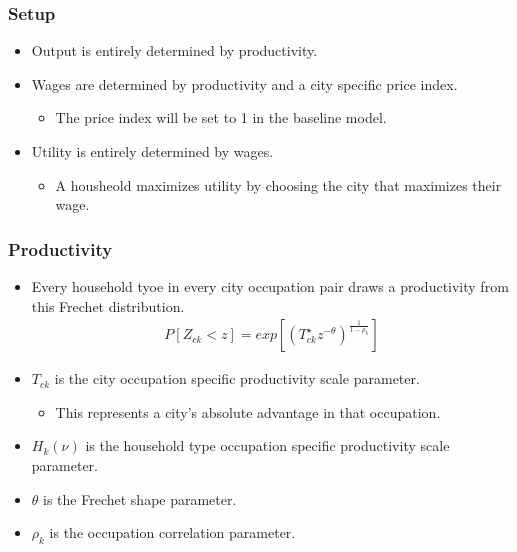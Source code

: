 \documentclass[serif, 9pt, aspectratio=32]{beamer}
\begin{document}
\begin{frame}
    \centering
    \frametitle{Setup}
    \begin{itemize}
        \setlength{\itemsep}{3em}
        \item Output is entirely determined by productivity.
        \item Wages are determined by productivity and a city specific price index.
              \begin{itemize}
                  \item The price index will be set to 1 in the baseline model.
              \end{itemize}
        \item Utility is entirely determined by wages.
              \begin{itemize}
                  \item A housheold maximizes utility by choosing the city that maximizes their wage.
              \end{itemize}
    \end{itemize}
\end{frame}

\begin{frame}
    \centering
    \frametitle{Productivity}
    \begin{itemize}
        \setlength{\itemsep}{2em}
        \item Every household tyoe in every city occupation pair draws a productivity from this Frechet distribution.
              \vspace{2em}
              \begin{equation}
                  \label{specific_Frechet}
                  \begin{aligned}
                      P[Z_{ck} < z] = exp[(T_{ck}^{\star} z^{-\theta})^{\frac{1}{1 - \rho_k}}]
                  \end{aligned}
              \end{equation}
    \end{itemize}
    \vspace{3em}
    \begin{itemize}
        \item $T_{ck}$ is the city occupation specific productivity scale parameter.
              \begin{itemize}
                  \item This represents a city's absolute advantage in that occupation.
              \end{itemize}
        \item $H_k(\nu)$ is the household type occupation specific productivity scale parameter.
        \item $\theta$ is the Frechet shape parameter.
        \item $\rho_k$ is the occupation correlation parameter.
    \end{itemize}
\end{frame}
\end{document}
